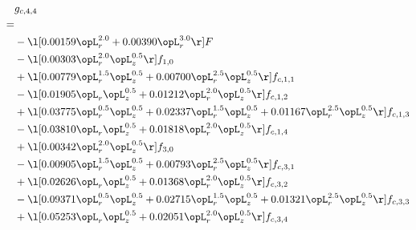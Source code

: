 \begin{alignat}{2} 
\label{eq:g_44_0} 
& g_{c,4,4} \nonumber \\ 
 = \\ 
& - \l[  0.00159 \opL_r^{2.0} +  0.00390 \opL_r^{3.0}  \r] F \nonumber \\ 
& - \l[  0.00303 \opL_r^{2.0} \opL_z^{0.5}  \r] f_{1,0} \nonumber \\ 
& + \l[  0.00779 \opL_r^{1.5} \opL_z^{0.5} +  0.00700 \opL_r^{2.5} \opL_z^{0.5}  \r] f_{c,1,1} \nonumber \\ 
& - \l[  0.01905 \opL_r \opL_z^{0.5} +  0.01212 \opL_r^{2.0} \opL_z^{0.5}  \r] f_{c,1,2} \nonumber \\ 
& + \l[  0.03775 \opL_r^{0.5} \opL_z^{0.5} +  0.02337 \opL_r^{1.5} \opL_z^{0.5} +  0.01167 \opL_r^{2.5} \opL_z^{0.5}  \r] f_{c,1,3} \nonumber \\ 
& - \l[  0.03810 \opL_r \opL_z^{0.5} +  0.01818 \opL_r^{2.0} \opL_z^{0.5}  \r] f_{c,1,4} \nonumber \\ 
& + \l[  0.00342 \opL_r^{2.0} \opL_z^{0.5}  \r] f_{3,0} \nonumber \\ 
& - \l[  0.00905 \opL_r^{1.5} \opL_z^{0.5} +  0.00793 \opL_r^{2.5} \opL_z^{0.5}  \r] f_{c,3,1} \nonumber \\ 
& + \l[  0.02626 \opL_r \opL_z^{0.5} +  0.01368 \opL_r^{2.0} \opL_z^{0.5}  \r] f_{c,3,2} \nonumber \\ 
& - \l[  0.09371 \opL_r^{0.5} \opL_z^{0.5} +  0.02715 \opL_r^{1.5} \opL_z^{0.5} +  0.01321 \opL_r^{2.5} \opL_z^{0.5}  \r] f_{c,3,3} \nonumber \\ 
& + \l[  0.05253 \opL_r \opL_z^{0.5} +  0.02051 \opL_r^{2.0} \opL_z^{0.5}  \r] f_{c,3,4} \nonumber \\ 
\end{alignat} 


